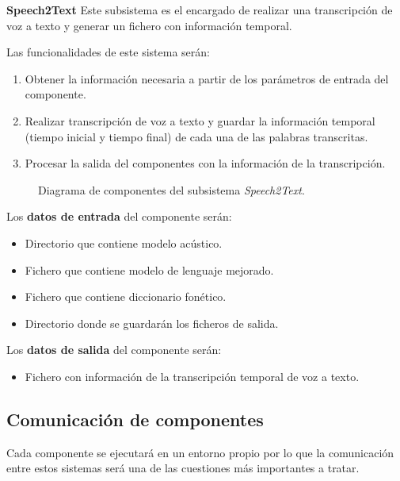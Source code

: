 \documentclass[../main.tex]{subfiles}
\begin{document}
\textbf{Speech2Text}\label{par:speech2text}
Este subsistema es el encargado de realizar una transcripción de voz a texto y generar un fichero con información temporal.


Las funcionalidades de este sistema serán:
\begin{enumerate}
    \item Obtener la información necesaria a partir de los parámetros de entrada del componente.
    \item Realizar transcripción de voz a texto y guardar la información temporal (tiempo inicial y tiempo final) de cada una de las palabras transcritas.
    \item Procesar la salida del componentes con la información de la transcripción.%
\end{enumerate}

\begin{figure}[H]
    \centering
    
    \label{fig:components_speech2text}
    \caption{Diagrama de componentes del subsistema \textit{Speech2Text}.}
\end{figure}

Los \textbf{datos de entrada} del componente serán:
\begin{itemize}
    \item Directorio que contiene modelo acústico.
    \item Fichero que contiene modelo de lenguaje mejorado.
    \item Fichero que contiene diccionario fonético.
    \item Directorio donde se guardarán los ficheros de salida.
\end{itemize}

Los \textbf{datos de salida} del componente serán:
\begin{itemize}
    \item Fichero con información de la transcripción temporal de voz a texto.
\end{itemize}

\subsection{Comunicación de componentes}\label{subsec:comunicacion_componentes}
Cada componente se ejecutará en un entorno propio por lo que la comunicación entre estos sistemas será una de las cuestiones más importantes a tratar.
\end{document}
